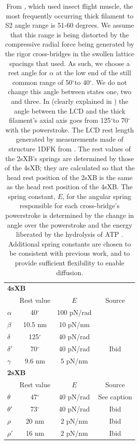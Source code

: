 \documentclass[]{article}
\newcommand{\de}{$^\circ$} %
\begin{document}
\begin{table}[ht]
    \begin{center}
    \begin{tabular}[t]{|l|ccc|} \hline
    \multicolumn{4}{|l|}{\textbf{4sXB}} \\ 
    \multicolumn{1}{|l}{~} 
              & Rest value & $E$        & Source \\ \cline{2-4}  
    $\alpha$  & 40\de      & 100 pN/rad & \citet{Liu2006}      \\
    $\beta$   & 10.5 nm    & 10 pN/nm   & \citet{Liu2006}      \\
    $\delta$  & 125\de     & 40 pN/rad  & \citet{Taylor1999}   \\
    $\delta'$ & 70\de      & 40 pN/rad  & Ibid                 \\
    $\gamma$  & 9.6 nm     & 5 pN/nm    & \citet{Houdusse2000} \\ \hline
    \multicolumn{4}{|l|}{\textbf{2sXB}} \\ 
    \multicolumn{1}{|l}{~} 
              & Rest value & $E$        & Source      \\ \cline{2-4} 
    $\theta$  & 47\de      & 40 pN/rad  & See caption \\
    $\theta'$ & 73\de      & 40 pN/rad  & Ibid        \\
    $\rho$    & 20 nm      & 2 pN/nm    & Ibid        \\
    $\rho'$   & 16 nm      & 2 pN/nm    & Ibid        \\ \hline
    \end{tabular}
    \end{center}
    \label{parameter_table}
    \caption{ 
    From \citet{Liu2006}, which used insect flight muscle, the most frequently occurring thick filament to S2 angle range is 51-60 degrees. 
    We assume that this range is being distorted by the compressive radial force being generated by the rigor cross-bridges in the swollen lattice spacings that \citet{Liu2006} used. 
    As such, we choose a rest angle for $\alpha$ at the low end of the still common range of 50\de to 40\de. 
    We do not change this angle between states one, two and three.
    In \citet{Taylor1999} (clearly explained in \citet{Davis2009}) the angle between the LCD and the thick filament's axial axis goes from 125\de to 70\de with the powerstroke. 
    The LCD rest length generated by measurements made of structure 1DFK from \citet{Houdusse2000}. 
    The rest values of the 2sXB's springs are determined by those of the 4sXB; they are calculated so that the head rest position of the 2sXB is the same as the head rest position of the 4sXB\@. 
    The spring constant, $E$, for the angular spring responsible for each cross-bridge's powerstroke is determined by the change in angle over the powerstroke and the energy liberated by the hydrolysis of ATP \citep{Tanner2007}. 
    Additional spring constants are chosen to be consistent with previous work, and to provide sufficient flexibility to enable diffusion. 
    }
\end{table}
\end{document}
